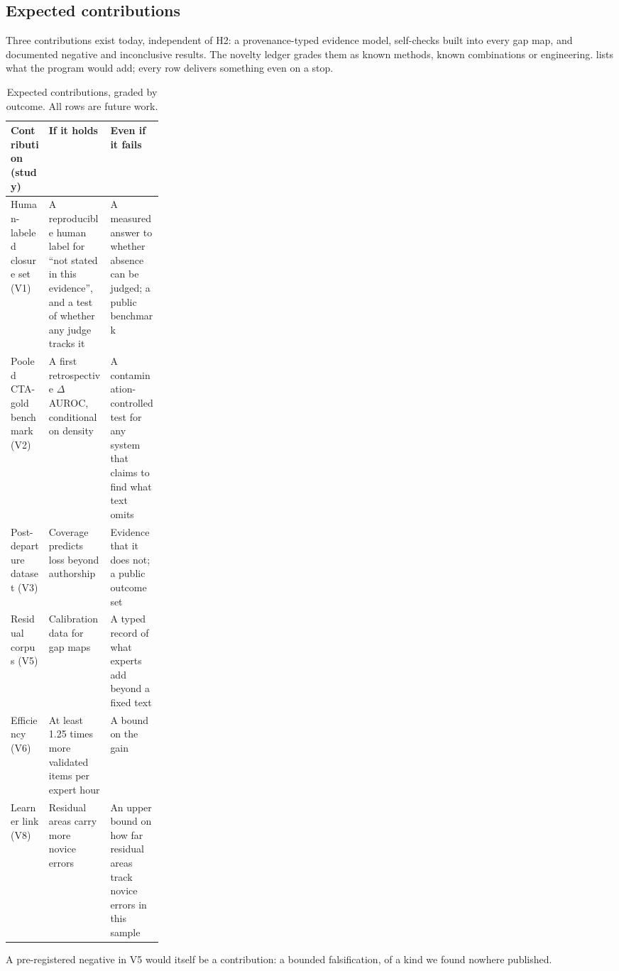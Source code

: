 \subsection{Expected contributions}

\evobs{} Three contributions exist today, independent of H2: a provenance-typed evidence model,
self-checks built into every gap map, and documented negative and inconclusive results. The novelty
ledger grades them as known methods, known combinations or engineering. \evfut{}  lists
what the program would add; every row delivers something even on a stop.

\begin{table}[htbp]
  \centering\footnotesize
  \caption{Expected contributions, graded by outcome. All rows are future work.}
  \label{tab:contrib}
  \begin{tabularx}{\linewidth}{@{}>{\raggedright\arraybackslash}p{0.25\linewidth}
      >{\raggedright\arraybackslash}X>{\raggedright\arraybackslash}X@{}}
    \toprule
    Contribution (study) & If it holds & Even if it fails \\
    \midrule
    Human-labeled closure set (V1) & \evhyp{} A reproducible human label for \enquote{not stated in this evidence}, and a test of whether any judge tracks it & A measured answer to whether absence can be judged; a public benchmark \\
    Pooled CTA-gold benchmark (V2) & \evhyp{} A first retrospective $\Delta$AUROC, conditional on density
      & A contamination-controlled test for any system that claims to find what text omits \\
    Post-departure dataset (V3) & \evhyp{} Coverage predicts loss beyond authorship & Evidence that it
      does not; a public outcome set \\
    Residual corpus (V5) & \evhyp{} Calibration data for gap maps & A typed record of what experts add
      beyond a fixed text \\
    Efficiency (V6) & \evhyp{} At least 1.25 times more validated items per expert hour & A bound on the
      gain \\
    Learner link (V8) & \evhyp{} Residual areas carry more novice errors & An upper bound on how far residual areas track novice errors in this sample \\
    \bottomrule
  \end{tabularx}
\end{table}

\evint{} A pre-registered negative in V5 would itself be a contribution: a bounded falsification, of a
kind we found nowhere published.
